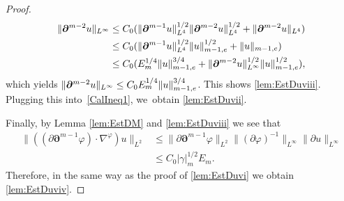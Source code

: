 \documentclass[11pt]{article}
\theoremstyle{definition}
\begin{document}
\begin{proof}
\begin{align*}
\|\bm{\partial}^{m-2} u\|_{L^\infty}
&\leq C_0 (\|\bm{\partial}^{m-1} u\|_{L^4}^{1/2} \|\bm{\partial}^{m-2} u\|_{L^4}^{1/2} + \|\bm{\partial}^{m-2} u\|_{L^4}) \\
&\leq C_0 (\|\bm{\partial}^{m-1} u\|_{L^4}^{1/2} \|u\|_{m-1,{\rm e}}^{1/2} + \|u\|_{m-1,{\rm e}}) \\
&\leq C_0 (E_m^{1/4}\|u\|_{m-1,{\rm e}}^{3/4} + \|\bm{\partial}^{m-2}u\|_{L^\infty}^{1/2}\|u\|_{m-1,{\rm e}}^{1/2}),
\end{align*}
which yields $\|\bm{\partial}^{m-2} u\|_{L^\infty} \leq C_0E_m^{1/4}\|u\|_{m-1,{\rm e}}^{3/4}$.
This shows \eqref{lem:EstDuviii}.
Plugging this into~\eqref{CalIneq1}, we~obtain \eqref{lem:EstDuvii}.

Finally, by Lemma \ref{lem:EstDM} and \eqref{lem:EstDuviii} we see that
\begin{align*}
\|((\partial\bm{\partial}^{m-1}\varphi)\cdot\nabla^\varphi)u\|_{L^2}
&\leq \|\partial\bm{\partial}^{m-1}\varphi\|_{L^2} \|(\partial\varphi)^{-1}\|_{L^\infty} \|\partial u\|_{L^\infty} \\
&\leq C_0|\gamma|_m^{1/2}E_m.
\end{align*}
Therefore, in the same way as the proof of \eqref{lem:EstDuvi} we obtain \eqref{lem:EstDuviv}.
\end{proof}
\end{document}
